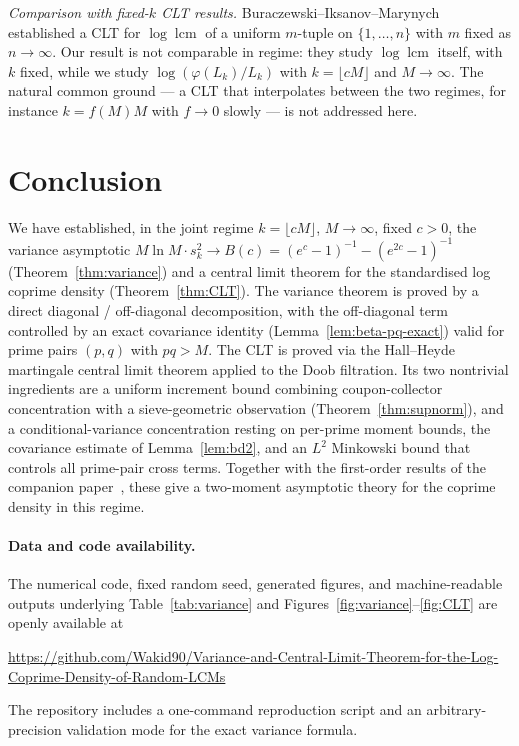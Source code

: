 \documentclass[11pt]{article}
\theoremstyle{remark}
\newcommand{\lcm}{\operatorname{lcm}}
\begin{document}
\emph{Comparison with fixed-$k$ CLT results.} Buraczewski--Iksanov--Marynych~\cite{BIM} established a CLT for $\log \lcm$ of a uniform $m$-tuple on $\{1, \ldots, n\}$ with $m$ fixed as $n \to \infty$. Our result is not comparable in regime: they study $\log \lcm$ itself, with $k$ fixed, while we study $\log(\varphi(L_k)/L_k)$ with $k = \lfloor cM \rfloor$ and $M \to \infty$. The natural common ground --- a CLT that interpolates between the two regimes, for instance $k = f(M) M$ with $f \to 0$ slowly --- is not addressed here.

\section{Conclusion}\label{sec:conclusion}

We have established, in the joint regime $k = \lfloor cM \rfloor$, $M \to \infty$, fixed $c > 0$, the variance asymptotic $M \ln M \cdot s_k^2 \to B(c) = (e^c - 1)^{-1} - (e^{2c} - 1)^{-1}$ (Theorem~\ref{thm:variance}) and a central limit theorem for the standardised log coprime density (Theorem~\ref{thm:CLT}). The variance theorem is proved by a direct diagonal / off-diagonal decomposition, with the off-diagonal term controlled by an exact covariance identity (Lemma~\ref{lem:beta-pq-exact}) valid for prime pairs $(p, q)$ with $pq > M$. The CLT is proved via the Hall--Heyde martingale central limit theorem applied to the Doob filtration. Its two nontrivial ingredients are a uniform increment bound combining coupon-collector concentration with a sieve-geometric observation (Theorem~\ref{thm:supnorm}), and a conditional-variance concentration resting on per-prime moment bounds, the covariance estimate of Lemma~\ref{lem:bd2}, and an $L^2$ Minkowski bound that controls all prime-pair cross terms. Together with the first-order results of the companion paper~\cite{wakid1}, these give a two-moment asymptotic theory for the coprime density in this regime.

\paragraph{Data and code availability.}
The numerical code, fixed random seed, generated figures, and machine-readable outputs underlying Table~\ref{tab:variance} and Figures~\ref{fig:variance}--\ref{fig:CLT} are openly available at
\begin{center}
\url{https://github.com/Wakid90/Variance-and-Central-Limit-Theorem-for-the-Log-Coprime-Density-of-Random-LCMs}
\end{center}
The repository includes a one-command reproduction script and an arbitrary-precision validation mode for the exact variance formula.
\end{document}
